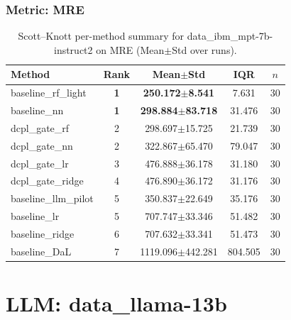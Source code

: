 \subsubsection*{Metric: MRE}
\begin{table}[H]
\centering
\scriptsize
\setlength{\tabcolsep}{4pt}
\renewcommand{\arraystretch}{1.1}
\caption{Scott--Knott per-method summary for data\_ibm\_mpt-7b-instruct2 on MRE (Mean$\pm$Std over runs).}
\label{tab:sk_data_ibm_mpt-7b-instruct2_MRE}
\begin{tabular}{l|c|c|c|c}
\hline
\textbf{Method} & \textbf{Rank} & \textbf{Mean$\pm$Std} & \textbf{IQR} & \textbf{$n$} \\
\hline
\rowcolor{red!15} baseline\_rf\_light & \textbf{1} & \textbf{250.172$\pm$8.541} & 7.631 & 30 \\
\rowcolor{red!15} baseline\_nn & \textbf{1} & \textbf{298.884$\pm$83.718} & 31.476 & 30 \\
dcpl\_gate\_rf & 2 & 298.697$\pm$15.725 & 21.739 & 30 \\
dcpl\_gate\_nn & 2 & 322.867$\pm$65.470 & 79.047 & 30 \\
dcpl\_gate\_lr & 3 & 476.888$\pm$36.178 & 31.180 & 30 \\
dcpl\_gate\_ridge & 4 & 476.890$\pm$36.172 & 31.176 & 30 \\
baseline\_llm\_pilot & 5 & 350.837$\pm$22.649 & 35.176 & 30 \\
baseline\_lr & 5 & 707.747$\pm$33.346 & 51.482 & 30 \\
baseline\_ridge & 6 & 707.632$\pm$33.341 & 51.473 & 30 \\
baseline\_DaL & 7 & 1119.096$\pm$442.281 & 804.505 & 30 \\
\hline
\end{tabular}
\end{table}


\newpage

\section*{LLM: data\_llama-13b}

